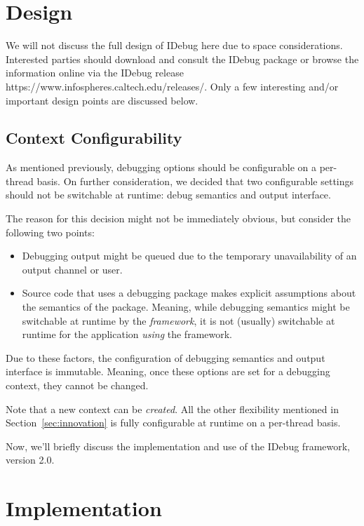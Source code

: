 \documentclass{article}
\begin{document}
\section{Design}

We will not discuss the full design of IDebug here due to space
considerations.  Interested parties should download and consult the
IDebug package or browse the information online via the IDebug release
{https://www.infospheres.caltech.edu/releases/}.  Only a few
interesting and/or important design points are discussed below.

\subsection{Context Configurability}

As mentioned previously, debugging options should be configurable on a
per-thread basis.  On further consideration, we decided that two
configurable settings should not be switchable at runtime: debug
semantics and output interface.

The reason for this decision might not be immediately obvious, but
consider the following two points:
\begin{itemize}
\item Debugging output might be queued due to the temporary
  unavailability of an output channel or user.
\item Source code that uses a debugging package makes explicit
  assumptions about the semantics of the package.  Meaning, while
  debugging semantics might be switchable at runtime by the
  \emph{framework}, it is not (usually) switchable at runtime for the
  application \emph{using} the framework.
\end{itemize}

Due to these factors, the configuration of debugging semantics and
output interface is immutable.  Meaning, once these options are set
for a debugging context, they cannot be changed.

Note that a new context can be \emph{created}.  All the other
flexibility mentioned in Section~\ref{sec:innovation} is fully
configurable at runtime on a per-thread basis.

Now, we'll briefly discuss the implementation and use of the IDebug
framework, version 2.0.

\section{Implementation}
\end{document}
